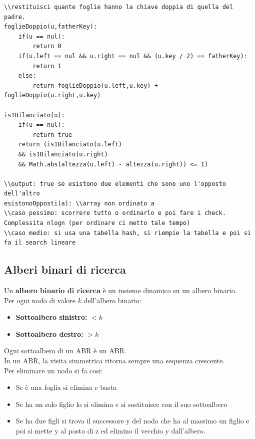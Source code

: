 \documentclass[a4paper,12pt]{article}
\begin{document}
\begin{lstlisting}
\\restituisci quante foglie hanno la chiave doppia di quella del padre.
foglieDoppio(u,fatherKey): 
    if(u == nul):
        return 0
    if(u.left == nul && u.right == nul && (u.key / 2) == fatherKey):
        return 1
    else:
        return foglieDoppio(u.left,u.key) + foglieDoppio(u.right,u.key)

is1Bilanciato(u):
    if(u == nul):
        return true
    return (is1Bilanciato(u.left) 
    && is1Bilanciato(u.right) 
    && Math.abs(altezza(u.left) - altezza(u.right)) <= 1)

\\output: true se esistono due elementi che sono uno l'opposto dell'altro
esistonoOpposti(a): \\array non ordinato a
\\caso pessimo: scorrere tutto o ordinarlo e poi fare i check. Complessita nlogn (per ordinare ci metto tale tempo)
\\caso medio: si usa una tabella hash, si riempie la tabella e poi si fa il search lineare

\end{lstlisting}

\subsection{Alberi binari di ricerca}
Un \textbf{albero binario di ricerca} è un insieme dinamico su un albero binario.\\
Per ogni nodo di valore $k$ dell'albero binario:
\begin{itemize}
    \item \textbf{Sottoalbero sinistro:} $< k$
    \item \textbf{Sottoalbero destro:} $> k$
\end{itemize}
Ogni sottoalbero di un ABR è un ABR.\\
In un ABR, la visita simmetrica ritorna sempre una sequenza crescente.\\
Per eliminare un nodo si fa cosi:
\begin{itemize}
    \item Se è una foglia si elimina e basta
    \item Se ha un solo figlio lo si elimina e si sostituisce con il suo sottoalbero
    \item Se ha due figli si trova il successore y del nodo che ha al massimo un figlio e poi si mette y al posto di z ed elimino il vecchio y dall'albero.
\end{itemize}
\end{document}
